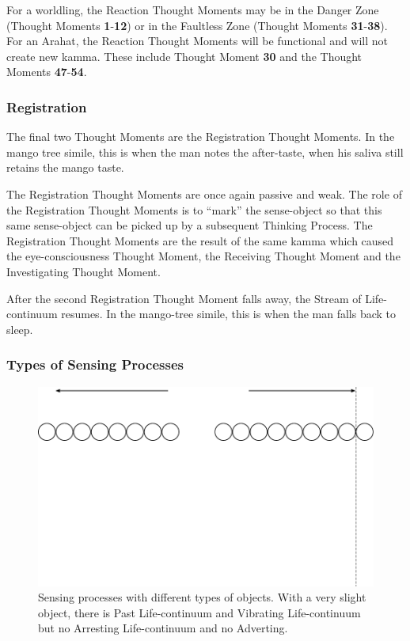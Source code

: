 For a worldling, the Reaction Thought Moments may be in the Danger Zone (Thought Moments \textbf{1}-\textbf{12}) or in the Faultless Zone (Thought Moments \textbf{31}-\textbf{38}). For an Arahat, the Reaction Thought Moments will be functional and will not create new kamma. These include Thought Moment \textbf{30} and the Thought Moments \textbf{47}-\textbf{54}.

\subsubsection*{Registration}

The final two Thought Moments are the Registration Thought Moments. In the mango tree simile, this is when the man notes the after-taste, when his saliva still retains the mango taste.

The Registration Thought Moments are once again passive and weak. The role of the Registration Thought Moments is to “mark” the sense-object so that this same sense-object can be picked up by a subsequent Thinking Process. The Registration Thought Moments are the result of the same kamma which caused the eye-consciousness Thought Moment, the Receiving Thought Moment and the Investigating Thought Moment.

After the second Registration Thought Moment falls away, the Stream of Life-continuum resumes. In the mango-tree simile, this is when the man falls back to sleep.

\subsubsection*{Types of Sensing Processes}

\begin{figure}[h]
\centering
\includegraphics[width=1\linewidth]{./Diagrams/Process1}
\caption{Sensing processes with different types of objects. With a very slight object, there is Past Life-continuum and Vibrating Life-continuum but no Arresting Life-continuum and no Adverting.}
\label{fig:Process1}
\end{figure}

